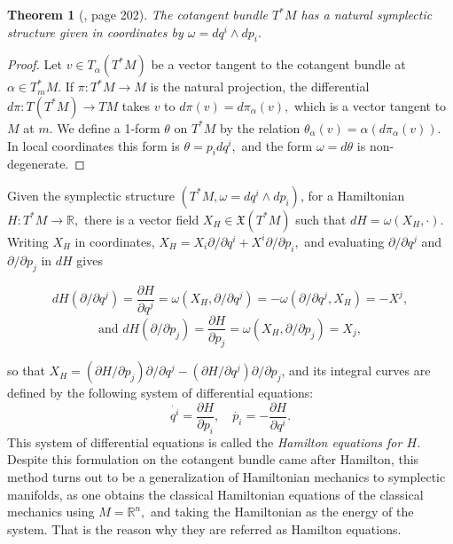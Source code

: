 \documentclass[12pt, letterpaper, reqno]{amsart}
\theoremstyle{definition}
\theoremstyle{plain}
\newtheorem{thm}{Theorem}
\theoremstyle{remark}
\begin{document}
\begin{thm}[\cite{arnol2013mathematical}, page 202]
	The cotangent bundle $ T^*M $ has a natural symplectic structure given in coordinates by $\omega = dq^i\wedge dp_i.$
\end{thm}

\begin{proof}
	Let $ v\in T_\alpha \left( T^*M \right)  $ be a vector tangent to the cotangent bundle at $ \alpha\in T^*_m M. $ If $ \pi:T^*M \rightarrow M $ is the natural projection, the differential $ d\pi : T \left( T^*M \right) \rightarrow TM $ takes $ v $ to $ d\pi(v)=d\pi_\alpha(v), $ which is a vector tangent to $ M $ at $ m. $ We define a 1-form $ \theta $ on $ T^*M $ by the relation $ \theta_\alpha(v)=\alpha(d\pi_\alpha(v)). $ In local coordinates this form is $ \theta= p_i dq^i, $ and the form $ \omega = d\theta $ is non-degenerate. 
\end{proof}

Given the symplectic structure $ (T^*M, \omega = dq^i\wedge dp_i) $, for a Hamiltonian $ H: T^*M \rightarrow \mathbb{R}, $ there is a vector field $ X_H \in \mathfrak{X}(T^*M) $ such that $ dH = \omega (X_H,\cdot) $. Writing $ X_H $ in coordinates, $ X_H = X_i \partial/\partial q^i + X^i \partial/\partial p_i, $ and evaluating $ \partial/\partial q^j $ and $ \partial/\partial p_j $ in $ dH $ gives  

$$ dH(\partial/\partial q^j) = \frac{\partial H}{\partial q^j} = \omega(X_H, \partial/\partial q^j) = -\omega(\partial/\partial q^j, X_H) = -X^j,$$ 
$$\text{and } dH(\partial/\partial p_j) = \frac{\partial H}{\partial p_j} =\omega(X_H, \partial/\partial p_j)=X_j, $$ 

so that $ X_H = (\partial H/\partial p_j)\partial/\partial q^j - (\partial H / \partial q^j)\partial/\partial p_j $, and its integral curves are defined by the following system of differential equations:
\begin{equation}\label{eq:hamilton_equations}
 \dot{q^i} = \frac{\partial H}{\partial p_i}, \quad \dot{p_i} =- \frac{\partial H}{\partial q^i}.    
\end{equation}
This system of differential equations is called the \textit{Hamilton equations for $ H $.} Despite this formulation on the cotangent bundle came after Hamilton, this method turns out to be a generalization of Hamiltonian mechanics to symplectic manifolds, as one obtains the classical Hamiltonian equations of the classical mechanics using $ M= \mathbb{R}^n, $ and taking the Hamiltonian as the energy of the system. That is the reason why they are referred as Hamilton equations.
\end{document}
